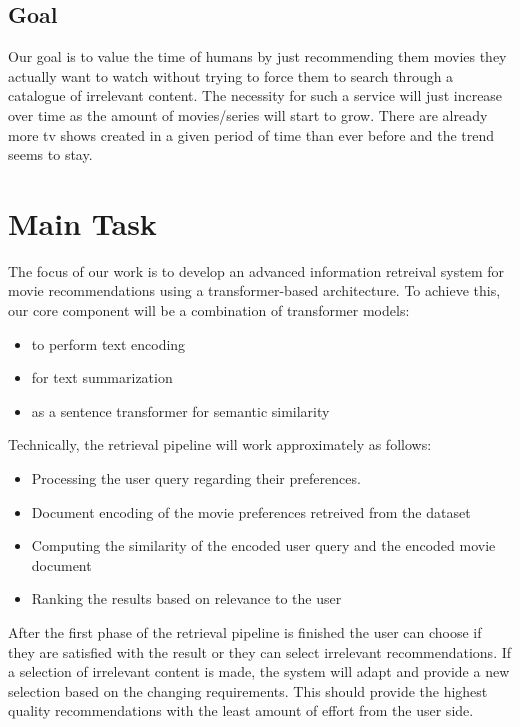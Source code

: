\documentclass[11pt,a4paper]{article}
\begin{document}
  \subsection{Goal}
  Our goal is to value the time of humans by just recommending them movies they actually want to watch without trying to force them to search through a catalogue of irrelevant content.
  The necessity for such a service will just increase over time as the amount of movies/series will start to grow.
  There are already more tv shows created in a given period of time than ever before and the trend seems to stay.

  \section{Main Task}

  The focus of our work is to develop an advanced information retreival system for movie recommendations using a transformer-based architecture.
  To achieve this, our core component will be a combination of transformer models:
  \begin{itemize}
    \item to perform text encoding
    \item for text summarization
    \item as a sentence transformer for semantic similarity
  \end{itemize}

  \noindent Technically, the retrieval pipeline will work approximately as follows:
  \begin{itemize}
    \item Processing the user query regarding their preferences.
    \item Document encoding of the movie preferences retreived from the dataset
    \item Computing the similarity of the encoded user query and the encoded movie document
    \item Ranking the results based on relevance to the user
  \end{itemize}

  \noindent After the first phase of the retrieval pipeline is finished the user can choose if they are satisfied with the result or they can select irrelevant recommendations.
  If a selection of irrelevant content is made, the system will adapt and provide a new selection based on the changing requirements.
  This should provide the highest quality recommendations with the least amount of effort from the user side.
\end{document}

